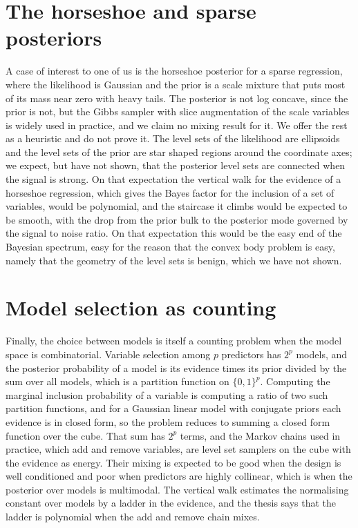 \section{The horseshoe and sparse posteriors}

A case of interest to one of us is the horseshoe posterior for a sparse regression, where the likelihood is Gaussian and the prior is a scale mixture that puts most of its mass near zero with heavy tails. The posterior is not log concave, since the prior is not, but the Gibbs sampler with slice augmentation of the scale variables is widely used in practice, and we claim no mixing result for it. We offer the rest as a heuristic and do not prove it. The level sets of the likelihood are ellipsoids and the level sets of the prior are star shaped regions around the coordinate axes; we expect, but have not shown, that the posterior level sets are connected when the signal is strong. On that expectation the vertical walk for the evidence of a horseshoe regression, which gives the Bayes factor for the inclusion of a set of variables, would be polynomial, and the staircase it climbs would be expected to be smooth, with the drop from the prior bulk to the posterior mode governed by the signal to noise ratio. On that expectation this would be the easy end of the Bayesian spectrum, easy for the reason that the convex body problem is easy, namely that the geometry of the level sets is benign, which we have not shown.

\section{Model selection as counting}

Finally, the choice between models is itself a counting problem when the model space is combinatorial. Variable selection among $p$ predictors has $2^p$ models, and the posterior probability of a model is its evidence times its prior divided by the sum over all models, which is a partition function on $\{0,1\}^p$. Computing the marginal inclusion probability of a variable is computing a ratio of two such partition functions, and for a Gaussian linear model with conjugate priors each evidence is in closed form, so the problem reduces to summing a closed form function over the cube. That sum has $2^p$ terms, and the Markov chains used in practice, which add and remove variables, are level set samplers on the cube with the evidence as energy. Their mixing is expected to be good when the design is well conditioned and poor when predictors are highly collinear, which is when the posterior over models is multimodal. The vertical walk estimates the normalising constant over models by a ladder in the evidence, and the thesis says that the ladder is polynomial when the add and remove chain mixes.
